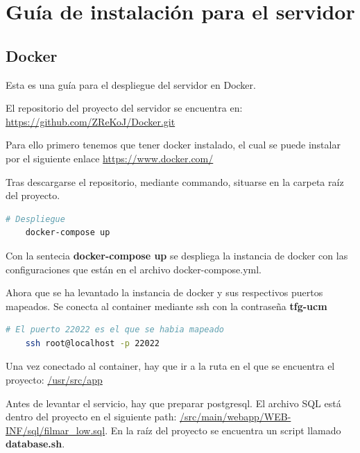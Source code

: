 
\cleardoublepage

\chapter{Guía de instalación para el servidor}
\label{app:guia_instalacion}

\section{Docker}
\label{app:docker}
Esta es una guía para el despliegue del servidor en Docker.

El repositorio del proyecto del servidor se encuentra en:
\url{https://github.com/ZReKoJ/Docker.git}

Para ello primero tenemos que tener docker instalado, el cual 
se puede instalar por el siguiente enlace \url{https://www.docker.com/}

Tras descargarse el repositorio, mediante commando, situarse en la carpeta raíz del proyecto.

\begin{lstlisting}[language=bash, caption=Despliegue de la instancia de docker]
    # Despliegue
    docker-compose up
\end{lstlisting}

Con la sentecia \textbf{docker-compose up} se despliega la instancia de docker con las configuraciones 
que están en el archivo docker-compose.yml.

Ahora que se ha levantado la instancia de docker y sus respectivos puertos mapeados.
Se conecta al container mediante ssh con la contraseña \textbf{tfg-ucm}

\begin{lstlisting}[language=bash, caption=Conexión ssh]
    # El puerto 22022 es el que se habia mapeado
    ssh root@localhost -p 22022
\end{lstlisting}

Una vez conectado al container, hay que ir a la ruta en el que se encuentra el proyecto: \url{/usr/src/app}

Antes de levantar el servicio, hay que preparar postgresql. El archivo SQL está dentro del proyecto
en el siguiente path: \url{/src/main/webapp/WEB-INF/sql/filmar_low.sql}. En la raíz del proyecto se 
encuentra un script llamado \textbf{database.sh}.

